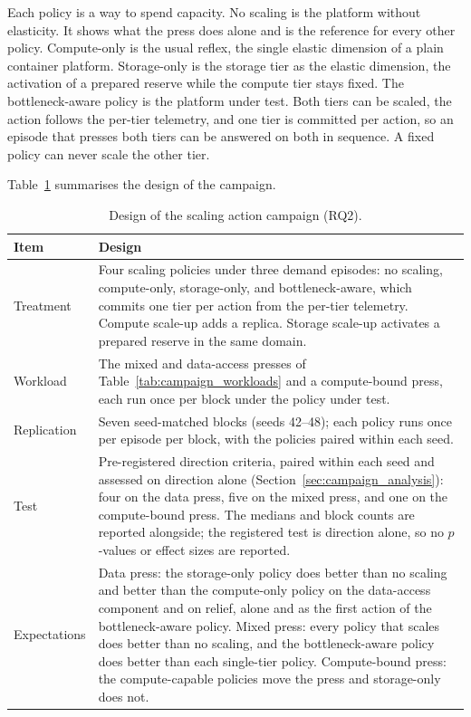 ﻿\documentclass[12pt,reqno,twoside]{amsbook}
\begin{document}
Each policy is a way to spend capacity. No scaling is the platform without
elasticity. It shows what the press does alone and is the reference for
every other policy. Compute-only is the usual reflex, the single elastic
dimension of a plain container platform. Storage-only is the storage tier as
the elastic dimension, the activation of a prepared reserve while the
compute tier stays fixed. The bottleneck-aware policy is the platform under
test. Both tiers can be scaled, the action follows the per-tier telemetry,
and one tier is committed per action, so an episode that presses both tiers
can be answered on both in sequence. A fixed policy can never scale the
other tier.

Table~\ref{tab:rq2_design} summarises the design of the campaign.

\begin{table}[htbp]
    \centering
    \caption{Design of the scaling action campaign (RQ2).}
    \label{tab:rq2_design}
    \footnotesize
    \begin{tabular}{p{} p{}}
        \toprule
        Item & Design \\
        \midrule
        Treatment & Four scaling policies under three demand episodes: no
        scaling, compute-only, storage-only, and bottleneck-aware, which
        commits one tier per action from the per-tier telemetry.
        Compute scale-up adds a replica. Storage scale-up activates a
        prepared reserve in the same domain. \\
        Workload & The mixed and data-access presses of
        Table~\ref{tab:campaign_workloads} and a compute-bound press, each
        run once per block under the policy under test. \\
        Replication & Seven seed-matched blocks (seeds 42--48); each policy
        runs once per episode per block, with the policies paired within each
        seed. \\
        Test & Pre-registered direction criteria, paired within each seed
        and assessed on direction alone
        (Section~\ref{sec:campaign_analysis}): four on the data press, five
        on the mixed press, and one on the compute-bound press. The medians
        and block counts are reported
        alongside; the registered test is direction alone, so no $p$-values
        or effect sizes are reported. \\
        Expectations & Data press: the storage-only policy does better than
        no scaling and better than the compute-only policy on the
        data-access component and on relief, alone and as the first action
        of the bottleneck-aware policy. Mixed press: every policy that
        scales does better than no scaling, and the bottleneck-aware policy
        does better than each single-tier policy. Compute-bound press: the
        compute-capable policies move the press and storage-only does not. \\
        \bottomrule
    \end{tabular}
\end{table}
\end{document}
